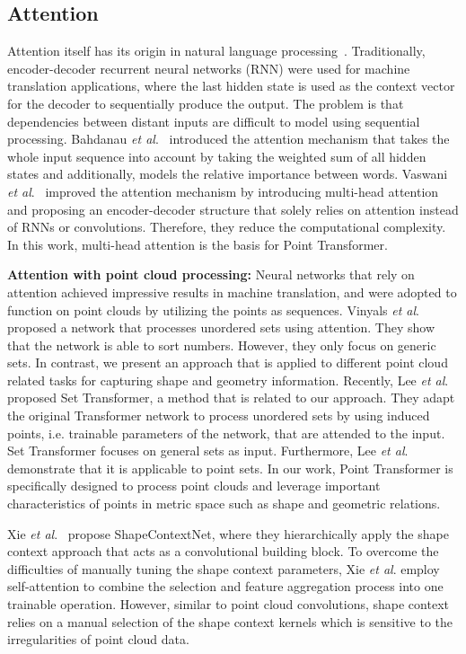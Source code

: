 \documentclass{ieeeaccess}
\begin{document}
\subsection{Attention}
Attention itself has its origin in natural language processing~\cite{bahdanau2014neural,luong2015effective}. Traditionally, encoder-decoder recurrent neural networks (RNN) were used for machine translation applications, where the last hidden state is used as the context vector for the decoder to sequentially produce the output. The problem is that dependencies between distant inputs are difficult to model using sequential processing. Bahdanau \textit{et al}.~\cite{bahdanau2014neural} introduced the attention mechanism that takes the whole input sequence into account by taking the weighted sum of all hidden states and additionally, models the relative importance between words. Vaswani \textit{et al}.~\cite{vaswani2017attention} improved the attention mechanism by introducing multi-head attention and proposing an encoder-decoder structure that solely relies on attention instead of RNNs or convolutions. Therefore, they reduce the computational complexity. In this work, multi-head attention is the basis for Point Transformer.

\textbf{Attention with point cloud processing:} Neural networks that rely on attention achieved impressive results in machine translation, and were adopted to function on point clouds by utilizing the points as sequences. Vinyals \textit{et al}.~\cite{vinyals2015order} proposed a network that processes unordered sets using attention. They show that the network is able to sort numbers. However, they only focus on generic sets. In contrast, we present an approach that is applied to different point cloud related tasks for capturing shape and geometry information.  Recently, Lee \textit{et al}.~\cite{lee2019set} proposed Set Transformer, a method that is related to our approach. They adapt the original Transformer network to process unordered sets by using induced points, i.e. trainable parameters of the network, that are attended to the input. 
Set Transformer focuses on general sets as input. Furthermore, Lee \textit{et al}. demonstrate that it is applicable to point sets. In our work, Point Transformer is specifically designed to process point clouds and leverage important characteristics of points in metric space such as shape and geometric relations.

Xie \textit{et al}.~\cite{xie2018attentional} propose ShapeContextNet, where they hierarchically apply the shape context approach that acts as a convolutional building block. To overcome the difficulties of manually tuning the shape context parameters, Xie \textit{et al}. employ self-attention to combine the selection and feature aggregation process into one trainable operation. However, similar to point cloud convolutions, shape context relies on a manual selection of the shape context kernels which is sensitive to the irregularities of point cloud data.
\end{document}
